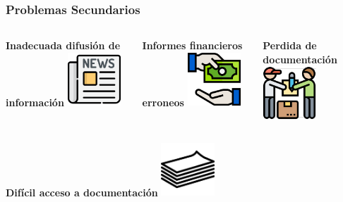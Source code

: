 \documentclass[xcolor=dvipsnames]{beamer}
\begin{document}
\begin{frame}
    \frametitle{Problemas Secundarios}
    \vspace{5mm}
    \begin{columns}
      \begin{column}{0.3\textwidth}
        \centering\textbf{\textcolor{color3}{\small Inadecuada difusión de información}\vspace{3mm}}
        \vspace{10mm}
        \includegraphics[width=20mm]{022-news.pdf}
      \end{column}
      \begin{column}{0.3\textwidth}
        \centering\textbf{\textcolor{color3}{\small Informes financieros erroneos}\vspace{3mm}}
        \vspace{10mm}
        \includegraphics[width=20mm]{025-pay.pdf}
      \end{column}
      \begin{column}{0.3\textwidth}
        \centering\textbf{\textcolor{color3}{\small Perdida de documentación}\vspace{3mm}}
        \vspace{10mm}
        \includegraphics[width=20mm]{002-delivery-man}
      \end{column}
    \end{columns}
    \vspace{-2mm}
    \begin{columns}
      \begin{column}{0.3\textwidth}
        \centering\textbf{\textcolor{color3}{\small Difícil acceso a documentación}\vspace{3mm}}
        \vspace{10mm}
        \includegraphics[width=20mm]{028-paper.pdf}

\end{column}
\end{columns}
\end{frame}
\end{document}
